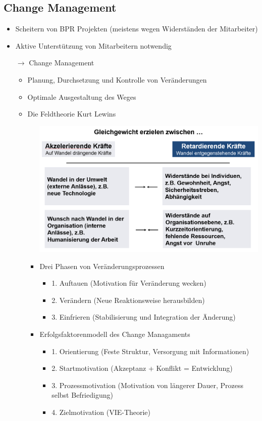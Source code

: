 \documentclass[11pt,a4paper]{article}
\begin{document}
\subsection{Change Management}
\begin{itemize}

\item Scheitern von BPR Projekten (meistens wegen Widerständen der Mitarbeiter)
\item Aktive Unterstützung von Mitarbeitern notwendig
\item[$\rightarrow$] Change Management
	\begin{itemize}
	\item Planung, Durchsetzung und Kontrolle von Veränderungen
	\item Optimale Ausgestaltung des Weges
	\item Die Feldtheorie Kurt Lewins
		\begin{itemize} \vspace{0.3cm}
		\item[] \includegraphics[width=15cm]{Bilder/kurtlewins1}
		\item Drei Phasen von Veränderungsprozessen
			\begin{itemize}
			\item 1. Auftauen (Motivation für Veränderung wecken)
			\item 2. Verändern (Neue Reaktionsweise herausbilden)
			\item 3. Einfrieren (Stabilisierung und Integration der Änderung)
			\end{itemize}
		\item Erfolgsfaktorenmodell des Change Managaments
			\begin{itemize}
			\item 1. Orientierung (Feste Struktur, Versorgung mit Informationen)
			\item 2. Startmotivation (Akzeptanz + Konflikt = Entwicklung)
			\item 3. Prozessmotivation (Motivation von längerer Dauer, Prozess selbst Befriedigung)
			\item 4. Zielmotivation (VIE-Theorie)
			\end{itemize}
		\end{itemize}
	\end{itemize}

\end{itemize}
\end{document}
